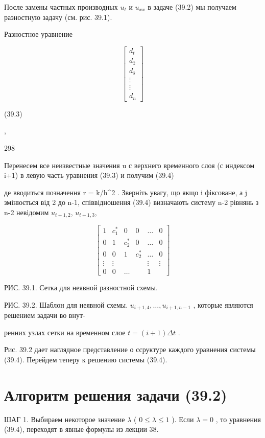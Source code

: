 \documentclass[
  ukrainian,
]{article}
\begin{document}
После замены частных производных \(u_t\) и \(u_{xx}\) в задаче (39.2) мы
получаем разностную задачу (см. рис. 39.1).

Разностное уравнение

\[
\begin{bmatrix} d_t \\ d_{\bar{z}} \\ d_{\bar{s}} \\ \vdots \\ \vdots \\ d_n \end{bmatrix}
\]

(39.3)

,

298

Перенесем все неизвестные значения u с верхнего временного слоя (с
индексом i+1) в левую часть уравнения (39.3) и получим (39.4)

де вводиться позначення r = k/h\^{}2 . Зверніть увагу, що якщо i
фіксоване, а j змінюється від 2 до n-1, співвідношення (39.4) визначають
систему n-2 рівнянь з n-2 невідомим \(u_{t+1,2}\), \(u_{t+1,3}\),

\[
\begin{bmatrix} 1 & c_1^* & 0 & 0 & \dots & 0 \\ 0 & 1 & c_2^* & 0 & \dots & 0 \\ 0 & 0 & 1 & c_2^* & \dots & 0 \\ \vdots & \vdots & & & \vdots & \vdots \\ 0 & 0 & \dots & & 1 \end{bmatrix}
\]

РИС. 39.1. Сетка для неявной разностной схемы.

РИС. 39.2. Шаблон для неявной схемы.
\(u_{i+1, 4}, \ldots, u_{i+1, n-1}\) , которые являются решением задачи
во внут-

ренних узлах сетки на временном слое \(t=(i+1)\Delta t\) .

Рис. 39.2 дает наглядное представление о ссруктуре каждого уравнения
системы (39.4). Перейдем теперу к решению системы (39.4).

\section{Алгоритм решения задачи
(39.2)}\label{ux430ux43bux433ux43eux440ux438ux442ux43c-ux440ux435ux448ux435ux43dux438ux44f-ux437ux430ux434ux430ux447ux438-39.2}

ШАГ 1. Выбираем некоторое значение \(\lambda\) ( \(0 \le \lambda \le 1\)
). Если \(\lambda = 0\) , то уравнения (39.4), переходят в явные формулы
из лекции 38.
\end{document}
